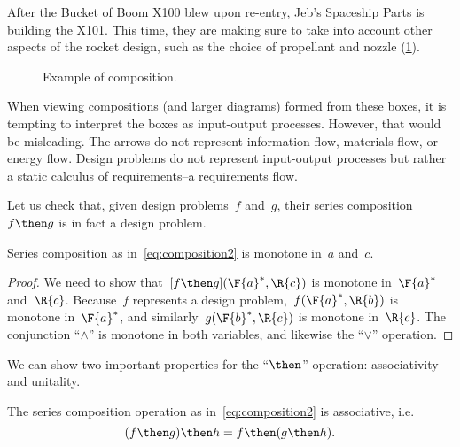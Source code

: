 \begin{example}
  After the Bucket of Boom X100 blew upon re-entry, Jeb's Spaceship Parts is building the X101. This time, they are making sure to take into account other aspects of the rocket design, such as the choice of propellant and nozzle (\cref{fig:examplecomposition}).
  \begin{figure}[h!]
    \begin{center}
    \end{center}
    \caption{Example of composition. \label{fig:examplecomposition}}
  \end{figure}
\end{example}

\begin{remark}
  When viewing compositions (and larger diagrams) formed from these boxes, it is tempting to interpret the boxes as input-output processes. However, that would be misleading. The arrows do not represent information flow, materials flow, or energy flow. Design problems do not represent input-output processes but rather a static calculus of requirements--a requirements flow.
\end{remark}

Let us check that, given design problems~$f$ and~$g$, their series composition~$f\then g$ is in fact a design problem.
\begin{lemma}
 Series composition as in~\cref{eq:composition2} is monotone in~$a$ and~$c$.
\end{lemma}
\begin{proof}
  We need to show that~$[f\then g](\F{a}^*,\R{c})$ is monotone in~$\F{a}^*$ and~$\R{c}$. Because~$f$ represents a design problem,~$f(\F{a}^*,\R{b})$ is monotone in~$\F{a}^*$, and similarly~$g(\F{b}^*,\R{c})$ is monotone in~$\R{c}$. The conjunction ``$\wedge$'' is monotone in both variables, and likewise the ``$\vee$'' operation.
\end{proof}

We can show two important properties for the ``$\then$'' operation: associativity and unitality.
\begin{lemma}
  The series composition operation as in~\cref{eq:composition2} is associative, i.e.
  \begin{equation}
    (f\then g)\then h = f\then (g\then h).
  \end{equation}
\end{lemma}

